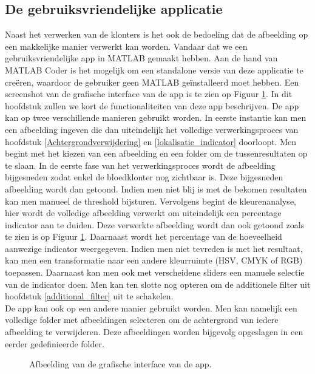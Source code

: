 \documentclass[a4paper,kulak]{kulakarticle}
\begin{document}
\subsection{De gebruiksvriendelijke applicatie}
Naast het verwerken van de klonters is het ook de bedoeling dat de afbeelding op een makkelijke manier verwerkt kan worden. Vandaar dat we een gebruiksvriendelijke app in MATLAB gemaakt hebben. Aan de hand van MATLAB Coder is het mogelijk om een standalone versie van deze applicatie te creëren, waardoor de gebruiker geen MATLAB geïnstalleerd moet hebben. Een screenshot van de grafische interface van de app is te zien op Figuur \ref{figuur interface}. In dit hoofdstuk zullen we kort de functionaliteiten van deze app beschrijven.
De app kan op twee verschillende manieren gebruikt worden. In eerste instantie kan men een afbeelding ingeven die dan uiteindelijk het volledige verwerkingsproces van hoofdstuk \ref{Achtergrondverwijdering} en \ref{lokalisatie_indicator} doorloopt. Men begint met het kiezen van een afbeelding en een folder om de tussenresultaten op te slaan. In de eerste fase van het verwerkingsproces wordt de afbeelding bijgesneden zodat enkel de bloedklonter nog zichtbaar is. Deze bijgesneden afbeelding wordt dan getoond. Indien men niet blij is met de bekomen resultaten kan men manueel de threshold bijsturen. Vervolgens begint de kleurenanalyse, hier wordt de volledige afbeelding verwerkt om uiteindelijk een percentage indicator aan te duiden. Deze verwerkte afbeelding wordt dan ook getoond zoals te zien is op Figuur \ref{figuur interface}. Daarnaast wordt het percentage van de hoeveelheid aanwezige indicator weergegeven. Indien men niet tevreden is met het resultaat, kan men een transformatie naar een andere kleurruimte (HSV, CMYK of RGB) toepassen. Daarnaast kan men ook met verscheidene sliders een manuele selectie van de indicator doen. Men kan ten slotte nog opteren om de additionele filter uit hoofdstuk \ref{additional_filter} uit te schakelen. \\
De app kan ook op een andere manier gebruikt worden. Men kan namelijk een volledige folder met afbeeldingen selecteren om de achtergrond van iedere afbeelding te verwijderen. Deze afbeeldingen worden bijgevolg opgeslagen in een eerder gedefinieerde folder.

\begin{figure}[H]
	\centering
	
	\caption{Afbeelding van de grafische interface van de app.}
	\label{figuur interface}
\end{figure}
\end{document}
